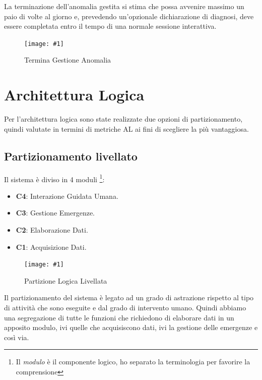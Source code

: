 \documentclass[a4paper,11pt,oneside, table]{article}
\newcommand{\putimage}[4] {
	\begin{figure}[H]
	    \centering
	    \texttt{[image: \#1]}
	    \caption{#2}\label{#3}
	\end{figure}
}
\newcommand{\bigimage}[4] {
	\begin{figure}[H]
	    \centering
	    \texttt{[image: \#1]}
	    \caption{#2}\label{#3}
	\end{figure}
}
\begin{document}
La terminazione dell'anomalia gestita si stima che possa avvenire massimo un paio di volte al giorno e, prevedendo un'opzionale dichiarazione di diagnosi, deve essere completata entro il tempo di una normale sessione interattiva.

\putimage{images/Diagramma delle Attivita'/Termina Gestione Anomalia.png}{Termina Gestione Anomalia}{png:act:termina-gestione-anomalia}{1}

\section{Architettura Logica}

Per l'architettura logica sono state realizzate due opzioni di partizionamento, quindi valutate in termini di metriche AL ai fini di scegliere la pi\`u vantaggiosa.

\subsection{Partizionamento livellato}

Il sistema \`e diviso in 4 moduli \footnote{Il \textit{modulo} \`e il componente logico, ho separato la terminologia per favorire la comprensione}:
\begin{itemize}
  \item \textbf{C4}: Interazione Guidata Umana.
  \item \textbf{C3}: Gestione Emergenze.
  \item \textbf{C2}: Elaborazione Dati.
  \item \textbf{C1}: Acquisizione Dati.
\end{itemize}

\bigimage{images/Diagramma delle Attivita'/Partizione Logica Livellata.png}{Partizione Logica Livellata}{png:act:partizione-logica-livellata}{1}

Il partizionamento del sistema \`e legato ad un grado di astrazione rispetto al tipo di attivit\`a che sono eseguite e dal grado di intervento umano. Quindi abbiamo una segregazione di tutte le funzioni che richiedono di elaborare dati in un apposito modulo, ivi quelle che acquisiscono dati, ivi la gestione delle emergenze e cos\`i via.
\end{document}
